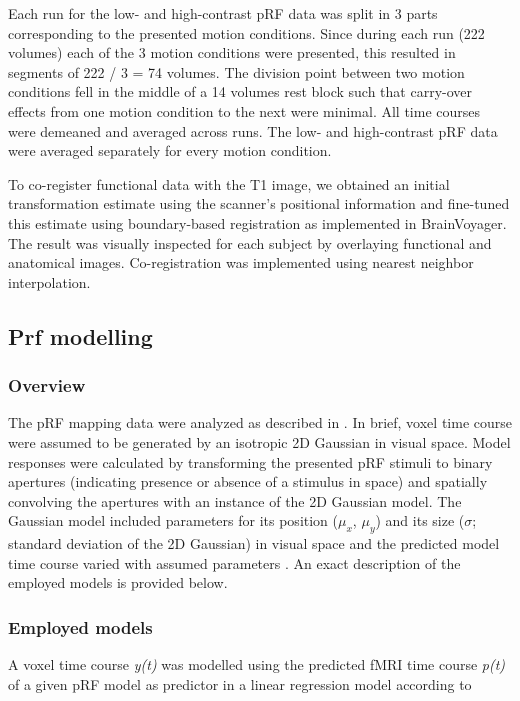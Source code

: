 Each run for the low- and high-contrast pRF data was split in 3 parts corresponding to the presented motion conditions. Since during each run (222 volumes) each of the 3 motion conditions were presented, this resulted in segments of 222 / 3 = 74 volumes. The division point between two motion conditions fell in the middle of a 14 volumes rest block such that carry-over effects from one motion condition to the next were minimal. All time courses were demeaned and averaged across runs. The low- and high-contrast pRF data were averaged separately for every motion condition.

To co-register functional data with the T1 image, we obtained an initial transformation estimate using the scanner’s positional information and fine-tuned this estimate using boundary-based registration \parencite{Greve2009} as implemented in BrainVoyager. The result was visually inspected for each subject by overlaying functional and anatomical images. Co-registration was implemented using nearest neighbor interpolation.

\subsection{Prf modelling}

\subsubsection{Overview}
The pRF mapping data were analyzed as described in \cite{Dumoulin2008, Harvey2011, Zuiderbaan2012, Kay2013, Kay2015}. In brief, voxel time course were assumed to be generated by an isotropic 2D Gaussian in visual space. Model responses were calculated by transforming the presented pRF stimuli to binary apertures (indicating presence or absence of a stimulus in space) and spatially convolving the apertures with an instance of the 2D Gaussian model. The Gaussian model included parameters for its position ($\mu_x$, $\mu_y$) and its size ($\sigma$; standard deviation of the 2D Gaussian) in visual space and the predicted model time course varied with assumed parameters \parencite{Dumoulin2008}. An exact description of the employed models is provided below.

\subsubsection{Employed models}
A voxel time course \textit{y(t)} was modelled using the predicted fMRI time course \textit{p(t)} of a given pRF model as predictor in a linear regression model according to

